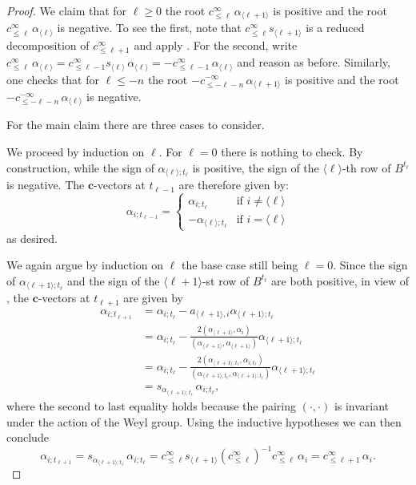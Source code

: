 \documentclass[12pt]{amsart}
\newcommand{\bfc}{\mathbf{c}}
\newcommand{\cv}{\alpha}
\renewcommand{\mod}[1]{\langle {#1} \rangle}
\newcommand{\Zidx}{\ell}
\theoremstyle{remark}
\numberwithin{equation}{section}
\numberwithin{figure}{section}
\begin{document}
\begin{proof}
  We claim that for $\Zidx \geq 0$ the root $c^\infty_{\leq \Zidx}\, \alpha_{\mod{\Zidx+1}}$ is positive and the root $c^\infty_{\leq \Zidx}\, \alpha_{\mod{\Zidx}}$ is negative.
  To see the first, note that $c^\infty_{\leq \Zidx} s_{\mod{\Zidx+1}}$ is a reduced decomposition of $c^\infty_{\leq \Zidx+1}$ and apply \cite[VI \S 1.6, Corollary 2 of Proposition 17]{Bou02}.
  For the second, write $c^\infty_{\leq \Zidx}\, \alpha_{\mod{\Zidx}} = c^\infty_{\leq \Zidx-1} s_{\mod{\Zidx}}\, \alpha_{\mod{\Zidx}} = -c^\infty_{\leq \Zidx-1}\, \alpha_{\mod{\Zidx}}$ and reason as before.
  Similarly, one checks that for $\Zidx \leq -n$ the root $-c^{-\infty}_{\le-\Zidx-n}\, \alpha_{\mod{\Zidx+1}}$ is positive and the root $-c^{-\infty}_{\le-\Zidx-n}\, \alpha_{\mod{\Zidx}}$ is negative.

  For the main claim there are three cases to consider.

  \noindent{\bf Case $-n \leq \Zidx \leq 0$.}
  We proceed by induction on $\Zidx$.
  For $\Zidx=0$ there is nothing to check.
  By construction, while the sign of $\cv_{\mod{\Zidx};t_\Zidx}$ is positive, the sign of the $\mod{\Zidx}$-th row of $B^{t_\Zidx}$ is negative.
  The $\bfc$-vectors at $t_{\Zidx-1}$ are therefore given by:
  \begin{equation*}
    \cv_{i;t_{\Zidx-1}}
    =
    \begin{cases}
      \cv_{i;t_\Zidx} & \text{if $i\neq \mod{\Zidx}$}\\
      -\cv_{\mod{\Zidx};t_\Zidx} & \text{if $i = \mod{\Zidx}$}
    \end{cases}
  \end{equation*}
  as desired.

  \noindent{\bf Case $\Zidx > 0$.}
  We again argue by induction on $\Zidx$ the base case still being $\Zidx=0$.
  Since the sign of $\cv_{\mod{\Zidx+1};t_\Zidx}$ and the sign of the $\mod{\Zidx+1}$-st row of $B^{t_\Zidx}$ are both positive, in view of \cite[Proposition 1.3]{NZ12}, the $\bfc$-vectors at $t_{\Zidx+1}$ are given by
  \begin{align*}
    \cv_{i;t_{\Zidx+1}}
    &=
    \cv_{i;t_\Zidx} - a_{\mod{\Zidx+1},i} \cv_{\mod{\Zidx+1};t_\Zidx}\\
    &=
    \cv_{i;t_\Zidx} - \frac{2(\alpha_{\mod{\Zidx+1}},\alpha_i)}{(\alpha_{\mod{\Zidx+1}},\alpha_{\mod{\Zidx+1}})} \cv_{\mod{\Zidx+1};t_\Zidx}\\
    &=
    \cv_{i;t_\Zidx} - \frac{2(\cv_{\mod{\Zidx+1};t_\Zidx},\cv_{i;t_\Zidx})}{(\cv_{\mod{\Zidx+1};t_\Zidx},\cv_{\mod{\Zidx+1};t_\Zidx})} \cv_{\mod{\Zidx+1};t_\Zidx}\\
    &=
    s_{\cv_{\mod{\Zidx+1};t_\Zidx}}\, \cv_{i;t_\Zidx},
  \end{align*}
  where the second to last equality holds because the pairing $(\cdot,\cdot)$ is invariant under the action of the Weyl group.
  Using the inductive hypotheses we can then conclude
  \[
    \cv_{i;t_{\Zidx+1}}
    =
    s_{\cv_{\mod{\Zidx+1};t_\Zidx}}\, \cv_{i;t_\Zidx}
    =
    c^\infty_{\le\Zidx} s_{\mod{\Zidx+1}} \left(c^\infty_{\le\Zidx}\right)^{-1} c^\infty_{\le\Zidx}\, \alpha_i
    =
    c^\infty_{\le\Zidx+1}\, \alpha_i.
  \]


\end{proof}
\end{document}
